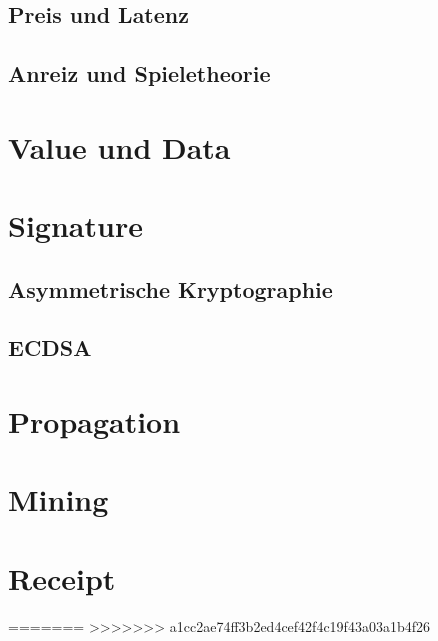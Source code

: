 \documentclass{llncs}
\begin{document}
\subsection{Preis und Latenz}

\subsection{Anreiz und Spieletheorie}

\section{Value und Data}

\section{Signature}

\subsection{Asymmetrische Kryptographie}

\subsection{ECDSA}

\section{Propagation}

\section{Mining}

\section{Receipt}
=======
>>>>>>> a1cc2ae74ff3b2ed4cef42f4c19f43a03a1b4f26



\end{document}

